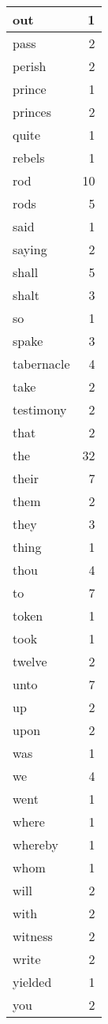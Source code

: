 \begin{center}
\begin{longtable}{l|r}
out & 1 \\ \hline
pass & 2 \\ \hline
perish & 2 \\ \hline
prince & 1 \\ \hline
princes & 2 \\ \hline
quite & 1 \\ \hline
rebels & 1 \\ \hline
rod & 10 \\ \hline
rods & 5 \\ \hline
said & 1 \\ \hline
saying & 2 \\ \hline
shall & 5 \\ \hline
shalt & 3 \\ \hline
so & 1 \\ \hline
spake & 3 \\ \hline
tabernacle & 4 \\ \hline
take & 2 \\ \hline
testimony & 2 \\ \hline
that & 2 \\ \hline
the & 32 \\ \hline
their & 7 \\ \hline
them & 2 \\ \hline
they & 3 \\ \hline
thing & 1 \\ \hline
thou & 4 \\ \hline
to & 7 \\ \hline
token & 1 \\ \hline
took & 1 \\ \hline
twelve & 2 \\ \hline
unto & 7 \\ \hline
up & 2 \\ \hline
upon & 2 \\ \hline
was & 1 \\ \hline
we & 4 \\ \hline
went & 1 \\ \hline
where & 1 \\ \hline
whereby & 1 \\ \hline
whom & 1 \\ \hline
will & 2 \\ \hline
with & 2 \\ \hline
witness & 2 \\ \hline
write & 2 \\ \hline
yielded & 1 \\ \hline
you & 2 \\ \hline
\end{longtable}
\end{center}



